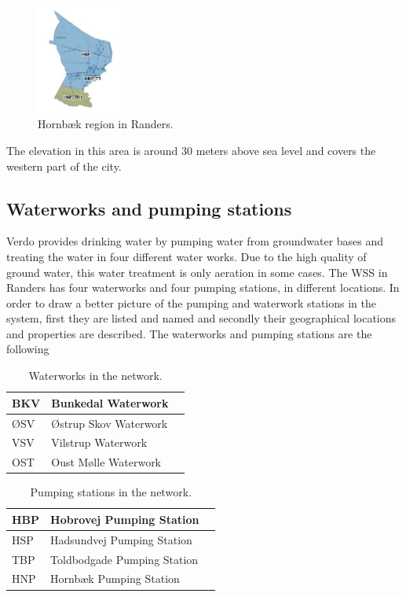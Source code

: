 \begin{figure}[H]
\centering
\includegraphics[width=0.25\textwidth]{report/pictures/Hornbaek_region}
\caption{Hornbæk region in Randers.}
\label{fig:hornbaek_region}
\end{figure}

The elevation in this area is around 30 meters above sea level and covers the western part of the city.  

\subsection{Waterworks and pumping stations}
\label{waterworks_and_pumping_stations}

Verdo provides drinking water by pumping water from groundwater bases and treating the water in four different water works. Due to the high quality of ground water, this water treatment is only aeration in some cases. The WSS in Randers has four waterworks and four pumping stations, in different locations. In order to draw a better picture of the pumping and waterwork stations in the system, first they are listed and named and secondly their geographical locations and properties are described. The waterworks and pumping stations are the following

\begin{table}[H]
\begin{center}
    \begin{tabular}{| l | l | l |}
    \hline
    BKV & Bunkedal Waterwork   \\ \hline
    ØSV & Østrup Skov Waterwork  \\ \hline
    VSV & Vilstrup Waterwork  \\ \hline
    OST & Oust Mølle Waterwork   \\
    \hline
    \end{tabular}
\end{center}
\caption{Waterworks in the network.}
\end{table}

\begin{table}[H]
\begin{center}
    \begin{tabular}{| l | l | l |}
    \hline
    HBP & Hobrovej Pumping Station   \\ \hline
    HSP & Hadsundvej Pumping Station  \\ \hline
    TBP & Toldbodgade Pumping Station  \\ \hline
    HNP & Hornbæk Pumping Station   \\
    \hline
    \end{tabular}
\end{center}
\caption{Pumping stations in the network.}
\end{table}

